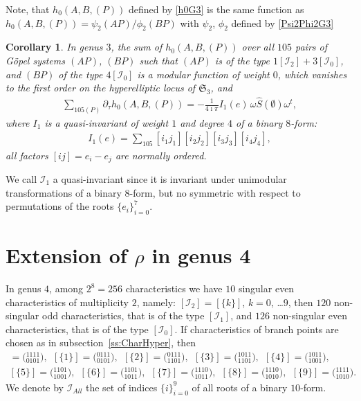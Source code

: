 \documentclass[twoside]{amsart}
\newcommand{\I}{\mathcal{I}}
\newtheorem{cor}{Corollary}[section]
\theoremstyle{definition}
\theoremstyle{plain}
\begin{document}
Note, that $h_0(A,B,(P))$ defined by \eqref{h0G3} 
is the same function as $h_0(A,B,(P)) = \psi_2(A P)/ \phi_2(B P)$ with
$\psi_2$, $\phi_2$ defined by \eqref{Psi2Phi2G3}


\begin{cor}\label{T:GSr2Invar}
In genus $3$,
the sum of $h_0 (A, B, (P))$ over all $105$
pairs of G\"{o}pel systems $(A P)$, $(B P)$ such that
$(AP)$ is of the type $1[\I_2]+3[\I_0]$, 
and $(B P)$ of the type $4[\I_0]$  is a modular function of weight $0$, which 
vanishes to the first order on the hyperelliptic locus of $\mathfrak{S}_3$,
and
\begin{gather*}
\sum_{105 (P)} \partial_\tau h_0 (A, B, (P)) = 
- \frac{1}{4\imath \pi} I_1(e)\, \omega \hat{S}(\emptyset) \omega^t,
\end{gather*}
where $I_1$ is a quasi-invariant of weight $1$ and degree $4$ of a binary $8$-form:
\begin{gather}\label{I1DefG3}
I_1(e) = \sum_{105}  [i_1 j_1] [i_2 j_2] [i_3j_3] [i_4j_4],
\end{gather}
all factors $[ij]=e_i-e_j$ are normally ordered.
\end{cor}
We call $\I_1$ a quasi-invariant since it is invariant under unimodular transformations 
of a binary $8$-form, but no symmetric with respect to permutations of the roots $\{e_i\}_{i=0}^7$.



\section{Extension of $\rho$  in genus 4}
In genus $4$, among $2^8=256$ characteristics we have $10$ singular even characteristics
of multiplicity $2$, namely:  $[\I_2]=[\{k\}]$, $k=0$, \ldots $9$, 
then  $120$ non-singular odd characteristics, that is of the type $[\I_1]$, and 
 $126$ non-singular even characteristics, that is of the type $[\I_0]$.
If characteristics of branch points are chosen as in subsection~\ref{ss:CharHyper}, then 
\begin{gather*}
[\{0\}]=\big({}^{1111}_{0101}\big),\ \  [\{1\}]=\big({}^{0111}_{0101}\big),\ \
[\{2\}]=\big({}^{0111}_{1101}\big), \ \  [\{3\}]=\big({}^{1011}_{1101}\big),\ \
[\{4\}]=\big({}^{1011}_{1001}\big),\\
[\{5\}]=\big({}^{1101}_{1001}\big),\ \ [\{6\}]=\big({}^{1101}_{1011}\big),\ \
[\{7\}]=\big({}^{1110}_{1011}\big),\ \  [\{8\}]=\big({}^{1110}_{1010}\big),\ \ 
[\{9\}]=\big({}^{1111}_{1010}\big).
\end{gather*}
We denote by $\I_{All}$ the set of indices $\{i\}_{i=0}^9$ of all roots of a binary $10$-form.
\end{document}
